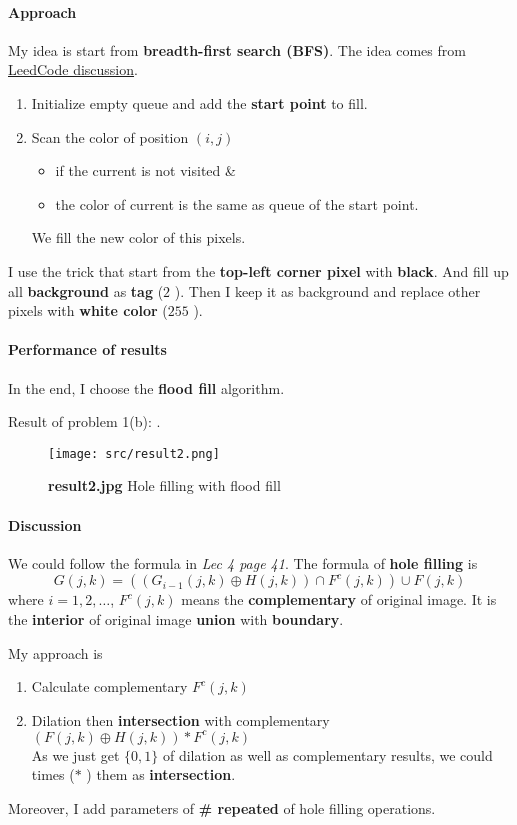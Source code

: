 \paragraph{Approach}
My idea is start from \textbf{breadth-first search (BFS)}. The idea comes from \href{https://leetcode.com/problems/flood-fill/discuss/1086688/Python-BFS-easiest-Soln}{LeedCode discussion}.
\begin{enumerate}
    \item Initialize empty queue and add the \textbf{start point} to fill.
    \item Scan the color of position \((i, j)\)
	\begin{itemize}
	    \item if the current is not visited \&
	    \item the color of current is the same as queue of the start point.
	\end{itemize}
	We fill the new color of this pixels.
\end{enumerate}
I use the trick that start from the \textbf{top-left corner pixel} with \textbf{black}. And fill up all \textbf{background} as \textbf{tag} (\(2\) ). Then I keep it as background and replace other pixels with \textbf{white color} (\(255\) ).

\paragraph{Performance of results}
In the end, I choose the \textbf{flood fill} algorithm.

Result of problem 1(b): .
\begin{figure}
    \centering
    \texttt{[image: src/result2.png]}
    \caption{\textbf{result2.jpg} Hole filling with flood fill}
    \label{result2}
\end{figure}

\paragraph{Discussion}
We could follow the formula in \textit{Lec 4 page 41}. The formula of \textbf{hole filling} is 
\[
    G(j, k) = ( (G_{i-1}(j, k) \oplus H(j, k) ) \cap F^{c}(j, k) ) \cup F(j, k)
\]
where \(i=1, 2, \dots \), \(F^{c}(j, k)\) means the \textbf{complementary} of original image.
It is the \textbf{interior} of original image \textbf{union} with \textbf{boundary}.

My approach is
\begin{enumerate}
    \item Calculate complementary \(F^{c}(j, k)\)
    \item Dilation then \textbf{intersection} with complementary \( (F(j, k) \oplus H(j, k)) \ast F^{c}(j, k) \) \\
	As we just get \(\{0, 1 \} \) of dilation as well as complementary results, we could times (\(\ast\) ) them as \textbf{intersection}.
\end{enumerate}
Moreover, I add parameters of \textbf{\# repeated} of hole filling operations.

